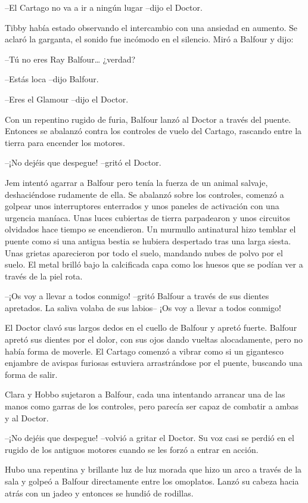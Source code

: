{--El Cartago no va a ir a ningún lugar --dijo el Doctor.}

{Tibby había estado observando el intercambio con una ansiedad en
 aumento. Se aclaró la garganta, el sonido fue incómodo en el silencio.
Miró a Balfour y dijo:}

{--Tú no eres Ray Balfour\ldots{} ¿verdad?}

{--Estás loca --dijo Balfour.}

{--Eres el Glamour --dijo el Doctor.}

{Con un repentino rugido de furia, Balfour lanzó al Doctor a través del
 puente. Entonces se abalanzó contra los controles de vuelo del Cartago,
rascando entre la tierra para encender los motores.}

{--¡No dejéis que despegue! --gritó el Doctor.}

{Jem intentó agarrar a Balfour pero tenía la fuerza de un animal salvaje,
 deshaciéndose rudamente de ella. Se abalanzó sobre los controles,
 comenzó a golpear unos interruptores enterrados y unos paneles de
 activación con una urgencia maníaca. Unas luces cubiertas de tierra
 parpadearon y unos circuitos olvidados hace tiempo se encendieron. Un
 murmullo antinatural hizo temblar el puente como si una antigua bestia
 se hubiera despertado tras una larga siesta. Unas grietas aparecieron
 por todo el suelo, mandando nubes de polvo por el suelo. El metal brilló
 bajo la calcificada capa como los huesos que se podían ver a través de
la piel rota.}

{--¡Os voy a llevar a todos conmigo! --gritó Balfour a través de sus
 dientes apretados. La saliva volaba de sus labios-- ¡Os voy a llevar a
todos conmigo!}

{El Doctor clavó sus largos dedos en el cuello de Balfour y apretó
 fuerte. Balfour apretó sus dientes por el dolor, con sus ojos dando
 vueltas alocadamente, pero no había forma de moverle. El Cartago comenzó
 a vibrar como si un gigantesco enjambre de avispas furiosas estuviera
arrastrándose por el puente, buscando una forma de salir.}

{Clara y Hobbo sujetaron a Balfour, cada una intentando arrancar una de
 las manos como garras de los controles, pero parecía ser capaz de
combatir a ambas y al Doctor.}

{--¡No dejéis que despegue! --volvió a gritar el Doctor. Su voz casi se
 perdió en el rugido de los antiguos motores cuando se les forzó a entrar
en acción.}

{Hubo una repentina y brillante luz de luz morada que hizo un arco a
 través de la sala y golpeó a Balfour directamente entre los omoplatos.
 Lanzó su cabeza hacia atrás con un jadeo y entonces se hundió de
rodillas.}

